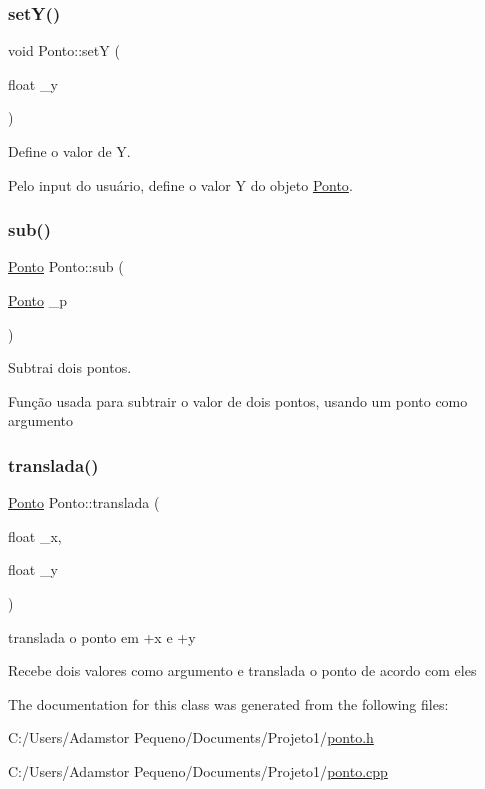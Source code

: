 \subsubsection{\texorpdfstring{set\+Y()}{setY()}}
{\footnotesize\ttfamily void Ponto\+::setY (\begin{DoxyParamCaption}\item[{float}]{\+\_\+y }\end{DoxyParamCaption})}



Define o valor de Y. 

Pelo input do usuário, define o valor Y do objeto \mbox{\hyperlink{class_ponto}{Ponto}}. \mbox{\label{class_ponto_a4c49d0e1863d645a6a8ac68c823b23bb}} 
\subsubsection{\texorpdfstring{sub()}{sub()}}
{\footnotesize\ttfamily \mbox{\hyperlink{class_ponto}{Ponto}} Ponto\+::sub (\begin{DoxyParamCaption}\item[{\mbox{\hyperlink{class_ponto}{Ponto}}}]{\+\_\+p }\end{DoxyParamCaption})}



Subtrai dois pontos. 

Função usada para subtrair o valor de dois pontos, usando um ponto como argumento \mbox{\label{class_ponto_a7e481afed576885a03c7a3db34df29fa}} 
\subsubsection{\texorpdfstring{translada()}{translada()}}
{\footnotesize\ttfamily \mbox{\hyperlink{class_ponto}{Ponto}} Ponto\+::translada (\begin{DoxyParamCaption}\item[{float}]{\+\_\+x,  }\item[{float}]{\+\_\+y }\end{DoxyParamCaption})}



translada o ponto em +x e +y 

Recebe dois valores como argumento e translada o ponto de acordo com eles 

The documentation for this class was generated from the following files\+:\begin{DoxyCompactItemize}
\item 
C\+:/\+Users/\+Adamstor Pequeno/\+Documents/\+Projeto1/\mbox{\hyperlink{ponto_8h}{ponto.\+h}}\item 
C\+:/\+Users/\+Adamstor Pequeno/\+Documents/\+Projeto1/\mbox{\hyperlink{ponto_8cpp}{ponto.\+cpp}}\end{DoxyCompactItemize}
